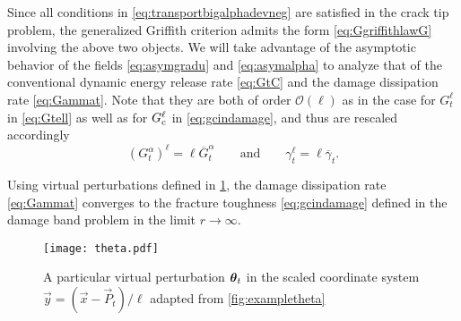 Since all conditions in \eqref{eq:transportbigalphadevneg} are satisfied in the crack tip problem, the generalized Griffith criterion admits the form \eqref{eq:GgriffithlawG} involving the above two objects. We will take advantage of the asymptotic behavior of the fields \eqref{eq:asymgradu} and \eqref{eq:asymalpha} to analyze that of the conventional dynamic energy release rate \eqref{eq:GtC} and the damage dissipation rate \eqref{eq:Gammat}. Note that they are both of order $\mathcal{O}(\ell)$ as in the case for $G_t^\ell$ in \eqref{eq:Gtell} as well as for $G_\mathrm{c}^\ell$ in \eqref{eq:gcindamage}, and thus are rescaled accordingly
\begin{equation} \label{eq:Gtalphaell}
(G^\alpha_t)^\ell=\ell\overline{G}^\alpha_t\qquad\text{and}\qquad\gamma_t^\ell=\ell\overline{\gamma}_t.
\end{equation}

\begin{proposition} \label{prop:Gammattogc}
Using virtual perturbations defined in \cref{fig:theta}, the damage dissipation rate \eqref{eq:Gammat} converges to the fracture toughness \eqref{eq:gcindamage} defined in the damage band problem in the limit $r\to\infty$.
\end{proposition}
\begin{figure}[htbp]
\centering
\texttt{[image: theta.pdf]}
\caption{A particular virtual perturbation $\vtheta_t$ in the scaled coordinate system $\vec{y}=(\vec{x}-\vec{P}_t)/\ell$ adapted from \cref{fig:exampletheta}} \label{fig:theta}
\end{figure}

